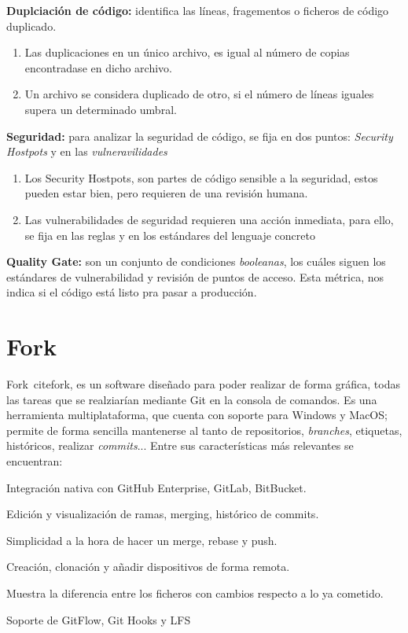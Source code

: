\begin{list}{\textbullet}{ %
    \addtolength{\itemsep}{-2mm} %
    \setlength{\itemindent}{2mm}}

    \item \textbf{Duplciación de código:} identifica las líneas, fragementos o ficheros de código duplicado.
    \begin{enumerate}
        \item Las duplicaciones en un único archivo, es igual al número de copias encontradase en dicho archivo.
        \item Un archivo se considera duplicado de otro, si el número de líneas iguales supera un determinado umbral.
    \end{enumerate}
    \item \textbf{Seguridad:} para analizar la seguridad de código, se fija en dos puntos: \textit{Security Hostpots} y en las \textit{vulneravilidades}
    \begin{enumerate}
        \item Los Security Hostpots, son partes de código sensible a la seguridad, estos pueden estar bien, pero requieren de una revisión humana.
        \item Las vulnerabilidades de seguridad requieren una acción inmediata, para ello, se fija en las reglas  y en los estándares del lenguaje concreto
    \end{enumerate}
    \item \textbf{Quality Gate:} son un conjunto de condiciones \textit{booleanas}, los cuáles siguen los estándares de vulnerabilidad y revisión de puntos de acceso. Esta métrica, nos indica si el código está listo pra pasar a producción.
\end{list}

\section{Fork}
Fork\ cite{fork}, es un software diseñado para poder realizar de forma gráfica, todas las tareas que se realziarían mediante Git en la consola de comandos.
Es una herramienta multiplataforma, que cuenta con soporte para Windows y MacOS; permite de forma sencilla mantenerse al tanto de repositorios, \textit{branches}, etiquetas, históricos, realizar \textit{commits}... Entre sus características más relevantes se encuentran:
\begin{list}{\textbullet}{ %
    \addtolength{\itemsep}{-2mm} %
    \setlength{\itemindent}{2mm}}

    \item Integración nativa con GitHub Enterprise, GitLab, BitBucket.
    \item Edición y visualización de ramas, merging, histórico de commits.
    \item Simplicidad a la hora de hacer un merge, rebase y push.
    \item Creación, clonación y añadir dispositivos de forma remota.
    \item Muestra la diferencia entre los ficheros con cambios respecto a lo ya cometido.
    \item Soporte de GitFlow, Git Hooks y LFS
\end{list}

